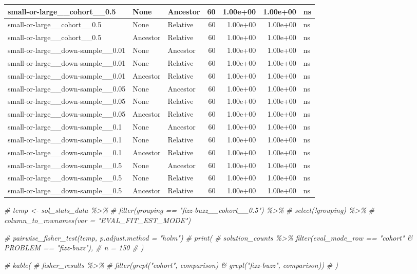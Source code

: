 \documentclass[
]{book}
\newenvironment{Shaded}{\begin{snugshade}}{\end{snugshade}}
\newcommand{\CommentTok}[1]{\textcolor[rgb]{0.56,0.35,0.01}{\textit{#1}}}
\begin{document}
\begin{tabular}{l|l|l|r|r|r|l}
\hline
small-or-large\_\_cohort\_\_0.5 & None & Ancestor & 60 & 1.00e+00 & 1.00e+00 & ns\\
\hline
small-or-large\_\_cohort\_\_0.5 & None & Relative & 60 & 1.00e+00 & 1.00e+00 & ns\\
\hline
small-or-large\_\_cohort\_\_0.5 & Ancestor & Relative & 60 & 1.00e+00 & 1.00e+00 & ns\\
\hline
small-or-large\_\_down-sample\_\_0.01 & None & Ancestor & 60 & 1.00e+00 & 1.00e+00 & ns\\
\hline
small-or-large\_\_down-sample\_\_0.01 & None & Relative & 60 & 1.00e+00 & 1.00e+00 & ns\\
\hline
small-or-large\_\_down-sample\_\_0.01 & Ancestor & Relative & 60 & 1.00e+00 & 1.00e+00 & ns\\
\hline
small-or-large\_\_down-sample\_\_0.05 & None & Ancestor & 60 & 1.00e+00 & 1.00e+00 & ns\\
\hline
small-or-large\_\_down-sample\_\_0.05 & None & Relative & 60 & 1.00e+00 & 1.00e+00 & ns\\
\hline
small-or-large\_\_down-sample\_\_0.05 & Ancestor & Relative & 60 & 1.00e+00 & 1.00e+00 & ns\\
\hline
small-or-large\_\_down-sample\_\_0.1 & None & Ancestor & 60 & 1.00e+00 & 1.00e+00 & ns\\
\hline
small-or-large\_\_down-sample\_\_0.1 & None & Relative & 60 & 1.00e+00 & 1.00e+00 & ns\\
\hline
small-or-large\_\_down-sample\_\_0.1 & Ancestor & Relative & 60 & 1.00e+00 & 1.00e+00 & ns\\
\hline
small-or-large\_\_down-sample\_\_0.5 & None & Ancestor & 60 & 1.00e+00 & 1.00e+00 & ns\\
\hline
small-or-large\_\_down-sample\_\_0.5 & None & Relative & 60 & 1.00e+00 & 1.00e+00 & ns\\
\hline
small-or-large\_\_down-sample\_\_0.5 & Ancestor & Relative & 60 & 1.00e+00 & 1.00e+00 & ns\\
\hline
\end{tabular}

\begin{Shaded}
\begin{Highlighting}[]
\CommentTok{\# temp \textless{}{-} sol\_stats\_data \%\textgreater{}\%}
\CommentTok{\#     filter(grouping == "fizz{-}buzz\_\_cohort\_\_0.5") \%\textgreater{}\%}
\CommentTok{\#     select(!grouping) \%\textgreater{}\%}
\CommentTok{\#     column\_to\_rownames(var = "EVAL\_FIT\_EST\_MODE")}

\CommentTok{\# pairwise\_fisher\_test(temp, p.adjust.method = "holm")}
\CommentTok{\# print(}
\CommentTok{\#   solution\_counts \%\textgreater{}\% filter(eval\_mode\_row == "cohort" \& PROBLEM == "fizz{-}buzz"),}
\CommentTok{\#   n = 150}
\CommentTok{\# )}

\CommentTok{\# kable(}
\CommentTok{\#   fisher\_results \%\textgreater{}\%}
\CommentTok{\#     filter(grepl("cohort", comparison) \& grepl("fizz{-}buzz", comparison))}
\CommentTok{\# )}
\end{Highlighting}
\end{Shaded}


  
\end{document}
